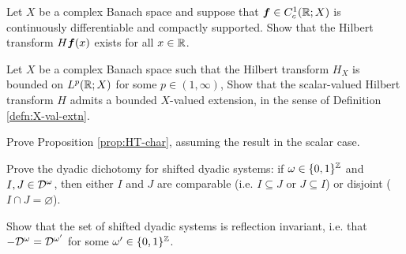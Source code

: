 \begin{exercise}\label{ex:HT-C1}
  Let $X$ be a complex Banach space and suppose that $\bm{f} \in C_{c}^1(\mathbb{R};X)$ is continuously differentiable and compactly supported.
  Show that the Hilbert transform $H\bm{f}(x)$ exists for all $x \in \mathbb{R}$.
\end{exercise}

\begin{exercise}
  Let $X$ be a complex Banach space such that the Hilbert transform $H_{X}$ is bounded on $L^p(\mathbb{R};X)$ for some $p \in (1,\infty)$,
  Show that the scalar-valued Hilbert transform $H$ admits a bounded $X$-valued extension, in the sense of Definition \ref{defn:X-val-extn}.
\end{exercise}

\begin{exercise}\label{ex:HT-char}
  Prove Proposition \ref{prop:HT-char}, assuming the result in the scalar case.
\end{exercise}

\begin{exercise}\label{ex:dyadic-dichotomy}
  Prove the dyadic dichotomy for shifted dyadic systems: if $\omega \in \{0,1\}^{\mathbb{Z}}$ and $I,J \in \mathcal{D}^{\omega}$, then either $I$ and $J$ are comparable (i.e. $I \subseteq J$ or $J \subseteq I$) or disjoint ($I \cap J = \varnothing$).
\end{exercise}

\begin{exercise}\label{ex:dyadic-refln-invariance}
  Show that the set of shifted dyadic systems is reflection invariant, i.e. that $-\mathcal{D}^{\omega} = \mathcal{D}^{\omega'}$ for some $\omega' \in \{0,1\}^{\mathbb{Z}}$.
\end{exercise}




